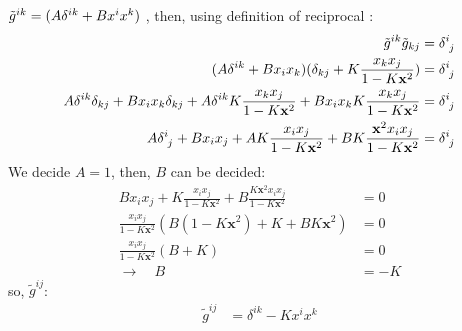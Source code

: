 \documentclass[11pt]{ltjsarticle}
\theoremstyle{plain}
\theoremstyle{break}
\newcommand{\mbfx}{\mathbf{x}}
\begin{document}
$\tilde{g}^{ik}= (A \tensor{\delta}{^{ik}} + Bx^i x^k)$
, then, using definition of reciprocal :
\begin{align}
\tilde{g}^{ik}\tilde{g}_{kj} &= \tensor{\delta}{^i_j} \\
(A \tensor{\delta}{^{ik}} + Bx_i x_k) (\delta_{kj} + K \frac{x_k x_j}{1- K \mbfx^2} ) & =  \tensor{\delta}{^i_j} \\
A \tensor{\delta}{^{ik}} \delta_{kj} + Bx_i x_k \delta_{kj} +A \tensor{\delta}{^{ik}}K \frac{x_k x_j}{1- K \mbfx^2} +Bx_i x_k K \frac{x_k x_j}{1- K \mbfx^2} & =  \tensor{\delta}{^i_j} \\
A \tensor{\delta}{^{i}_j} + Bx_i x_j  +A K \frac{x_i x_j}{1- K \mbfx^2} +BK \frac{\mbfx^2 x_i x_j}{1- K \mbfx^2} & =  \tensor{\delta}{^i_j}
\end{align}
We decide $A=1$, then, $B$ can be decided:
\begin{align}
Bx_i x_j  + K \frac{x_i x_j}{1- K \mbfx^2} +B \frac{ K \mbfx^2 x_i x_j}{1- K \mbfx^2} & =0\\
\frac{x_i x_j}{1- K\mbfx^2}(B(1-K\mbfx^2) + K +B K\mbfx^2)&=0\\
\frac{x_i x_j}{1- K\mbfx^2}(B+K)&=0 \\
\rightarrow \quad B &= -K
\end{align}%
so, $\tilde{g}^{ij}$:
\begin{align}
\tilde{g}^{ij}
&=\delta^{ik} - K x^i x^k
\end{align}
\end{document}
